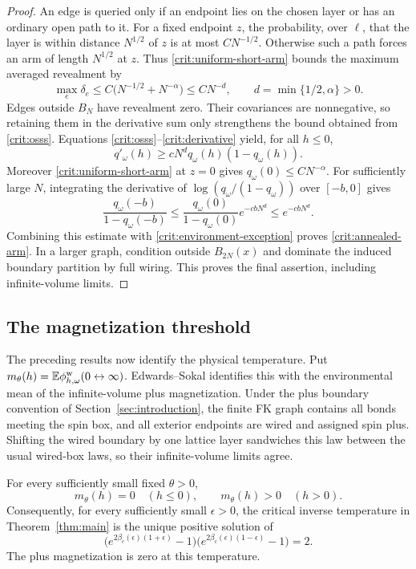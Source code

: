 \begin{proof}
An edge is queried only if an endpoint lies on the chosen layer or
has an ordinary open path to it. For a fixed endpoint $z$, the
probability, over $\ell$, that the layer is within distance
$N^{1/2}$ of $z$ is at most $C N^{-1/2}$. Otherwise such a path forces
an arm of length $N^{1/2}$ at $z$. Thus
\eqref{crit:uniform-short-arm} bounds the maximum averaged revealment
by
\[
 \max_e\delta_e\le C\bigl(N^{-1/2}+N^{-\alpha}\bigr)
                   \le C N^{-d},\qquad
 d=\min\{1/2,\alpha\}>0.
\]
Edges outside $B_N$ have revealment zero. Their covariances are
nonnegative, so retaining them in the derivative sum only strengthens
the bound obtained from \eqref{crit:osss}. Equations
\eqref{crit:osss}--\eqref{crit:derivative} yield, for all $h\le0$,
\begin{equation}
 q'_\omega(h)\ge cN^d q_\omega(h)(1-q_\omega(h)).
 \label{crit:sharp-differential}
\end{equation}
Moreover \eqref{crit:uniform-short-arm} at $z=0$ gives
$q_\omega(0)\le C N^{-\alpha}$. For sufficiently large $N$, integrating
the derivative of $\log(q_\omega/(1-q_\omega))$ over $[-b,0]$ gives
\[
 \frac{q_\omega(-b)}{1-q_\omega(-b)}
 \le \frac{q_\omega(0)}{1-q_\omega(0)}e^{-cbN^d}
 \le e^{-cbN^d}.
\]
Combining this estimate with \eqref{crit:environment-exception} proves
\eqref{crit:annealed-arm}. In a larger graph, condition outside
$B_{2N}(x)$ and dominate the induced boundary partition by full
wiring. This proves the final assertion, including infinite-volume
limits.
\end{proof}

\subsection{The magnetization threshold}

The preceding results now identify the physical temperature. Put
$m_\theta(h)=\mathbb E\phi_{h,\omega}^{\mathrm w}(0\leftrightarrow\infty)$.
Edwards--Sokal identifies this with the environmental mean of the
infinite-volume plus magnetization. Under the plus boundary convention of
Section~\ref{sec:introduction}, the finite FK graph contains all bonds meeting the spin box,
and all exterior endpoints are wired and assigned spin plus. Shifting
the wired boundary by one lattice layer sandwiches this law between
the usual wired-box laws, so their infinite-volume limits agree.

\begin{theorem}
\label{crit:physical}
For every sufficiently small fixed $\theta>0$,
\[
 m_\theta(h)=0\quad(h\le0),\qquad
 m_\theta(h)>0\quad(h>0).
\]
Consequently, for every sufficiently small $\epsilon>0$, the critical
inverse temperature in Theorem~\ref{thm:main} is the unique positive
solution of
\begin{equation}
 \bigl(e^{2\beta_c(\epsilon)(1+\epsilon)}-1\bigr)
 \bigl(e^{2\beta_c(\epsilon)(1-\epsilon)}-1\bigr)=2.
 \label{crit:physical-equation}
\end{equation}
The plus magnetization is zero at this temperature.
\end{theorem}

